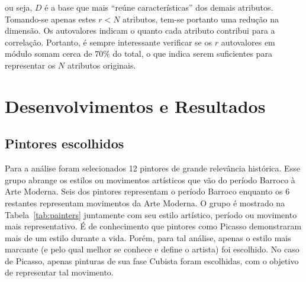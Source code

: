 \noindent ou seja, $D$ é a base que mais ``reúne características'' dos demais
atributos. Tomando-se apenas estes $r < N$ atributos, tem-se portanto uma
redução na dimensão. Os autovalores indicam o quanto cada
atributo contribui para a correlação. Portanto, é sempre interessante verificar se
os $r$ autovalores em módulo somam cerca de $70\%$ do total, o que indica
serem suficientes para representar os $N$ atributos originais.~\cite{luciano}




\chapter{Desenvolvimentos e Resultados}
\label{chap:resultados}


\section{Pintores escolhidos}

Para a análise foram selecionados 12 pintores de grande relevância
histórica. Esse grupo abrange os estilos ou movimentos artísticos que
vão do período Barroco à Arte Moderna. Seis dos pintores representam o
período Barroco enquanto os 6 restantes representam movimentos da Arte
Moderna. O grupo é mostrado na Tabela~\ref{tab:painters} juntamente
com seu estilo artístico, período ou movimento mais representativo. É
de conhecimento que pintores como Picasso demonstraram mais de um
estilo durante a vida. Porém, para tal análise, apenas o estilo mais
marcante (e pelo qual melhor se conhece e define o artista) foi
escolhido. No caso de Picasso, apenas pinturas de sua fase Cubista
foram escolhidas, com o objetivo de representar tal movimento.

